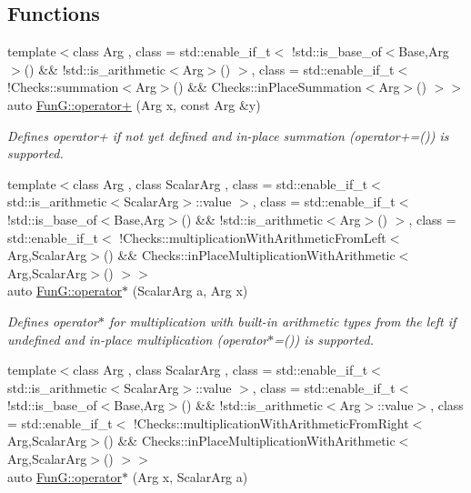 \subsection*{Functions}
\begin{DoxyCompactItemize}
\item 
{\footnotesize template$<$class Arg , class  = std\+::enable\+\_\+if\+\_\+t$<$ !std\+::is\+\_\+base\+\_\+of$<$\+Base,\+Arg$>$() \&\& !std\+::is\+\_\+arithmetic$<$\+Arg$>$() $>$, class  = std\+::enable\+\_\+if\+\_\+t$<$ !\+Checks\+::summation$<$\+Arg$>$() \&\&                                       Checks\+::in\+Place\+Summation$<$\+Arg$>$() $>$$>$ }\\auto \hyperlink{namespaceFunG_a063d3e8c19dbea3ee1396736fecb64e1}{Fun\+G\+::operator+} (Arg x, const Arg \&y)
\begin{DoxyCompactList}\small\item\em Defines operator+ if not yet defined and in-\/place summation (operator+=()) is supported. \end{DoxyCompactList}\item 
{\footnotesize template$<$class Arg , class Scalar\+Arg , class  = std\+::enable\+\_\+if\+\_\+t$<$ std\+::is\+\_\+arithmetic$<$\+Scalar\+Arg$>$\+::value $>$, class  = std\+::enable\+\_\+if\+\_\+t$<$ !std\+::is\+\_\+base\+\_\+of$<$\+Base,\+Arg$>$() \&\& !std\+::is\+\_\+arithmetic$<$\+Arg$>$() $>$, class  = std\+::enable\+\_\+if\+\_\+t$<$ !\+Checks\+::multiplication\+With\+Arithmetic\+From\+Left$<$\+Arg,\+Scalar\+Arg$>$() \&\&                                       Checks\+::in\+Place\+Multiplication\+With\+Arithmetic$<$\+Arg,\+Scalar\+Arg$>$() $>$$>$ }\\auto \hyperlink{namespaceFunG_a9b303ce8718a6f64b035e7e782370734}{Fun\+G\+::operator$\ast$} (Scalar\+Arg a, Arg x)
\begin{DoxyCompactList}\small\item\em Defines operator$\ast$ for multiplication with built-\/in arithmetic types from the left if undefined and in-\/place multiplication (operator$\ast$=()) is supported. \end{DoxyCompactList}\item 
{\footnotesize template$<$class Arg , class Scalar\+Arg , class  = std\+::enable\+\_\+if\+\_\+t$<$ std\+::is\+\_\+arithmetic$<$\+Scalar\+Arg$>$\+::value $>$, class  = std\+::enable\+\_\+if\+\_\+t$<$ !std\+::is\+\_\+base\+\_\+of$<$\+Base,\+Arg$>$() \&\& !std\+::is\+\_\+arithmetic$<$\+Arg$>$\+::value$>$, class  = std\+::enable\+\_\+if\+\_\+t$<$ !\+Checks\+::multiplication\+With\+Arithmetic\+From\+Right$<$\+Arg,\+Scalar\+Arg$>$() \&\&                                       Checks\+::in\+Place\+Multiplication\+With\+Arithmetic$<$\+Arg,\+Scalar\+Arg$>$() $>$$>$ }\\auto \hyperlink{namespaceFunG_a3cd5a2cb1abba842154691bb84aab896}{Fun\+G\+::operator$\ast$} (Arg x, Scalar\+Arg a)

\end{DoxyCompactItemize}
